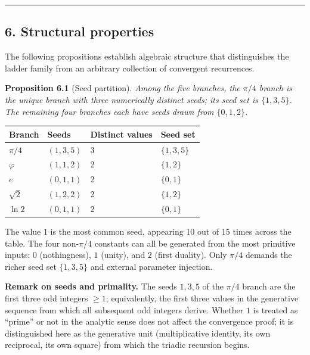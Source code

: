 \documentclass[
  11pt,
  letterpaper,
]{article}
\begin{document}
\begin{center}\rule{0.5\linewidth}{0.5pt}\end{center}

\subsection{6. Structural properties}\label{structural-properties}

The following propositions establish algebraic structure that
distinguishes the ladder family from an arbitrary collection of
convergent recurrences.

\textbf{Proposition 6.1} (Seed partition). \emph{Among the five
branches, the \(\pi/4\) branch is the unique branch with three
numerically distinct seeds; its seed set is \(\{1, 3, 5\}\). The
remaining four branches each have seeds drawn from \(\{0, 1, 2\}\).}

\begin{longtable}[]{@{}llll@{}}
\toprule\noalign{}
Branch & Seeds & Distinct values & Seed set \\
\midrule\noalign{}
\endhead
\bottomrule\noalign{}
\endlastfoot
\(\pi/4\) & \((1,3,5)\) & 3 & \(\{1,3,5\}\) \\
\(\varphi\) & \((1,1,2)\) & 2 & \(\{1,2\}\) \\
\(e\) & \((0,1,1)\) & 2 & \(\{0,1\}\) \\
\(\sqrt{2}\) & \((1,2,2)\) & 2 & \(\{1,2\}\) \\
\(\ln 2\) & \((0,1,1)\) & 2 & \(\{0,1\}\) \\
\end{longtable}

The value \(1\) is the most common seed, appearing 10 out of 15 times
across the table. The four non-\(\pi/4\) constants can all be generated
from the most primitive inputs: \(0\) (nothingness), \(1\) (unity), and
\(2\) (first duality). Only \(\pi/4\) demands the richer seed set
\(\{1, 3, 5\}\) and external parameter injection.

\textbf{Remark on seeds and primality.} The seeds \(1, 3, 5\) of the
\(\pi/4\) branch are the first three odd integers \(\geq 1\);
equivalently, the first three values in the generative sequence from
which all subsequent odd integers derive. Whether \(1\) is treated as
``prime'' or not in the analytic sense does not affect the convergence
proof; it is distinguished here as the generative unit (multiplicative
identity, its own reciprocal, its own square) from which the triadic
recursion begins.
\end{document}
